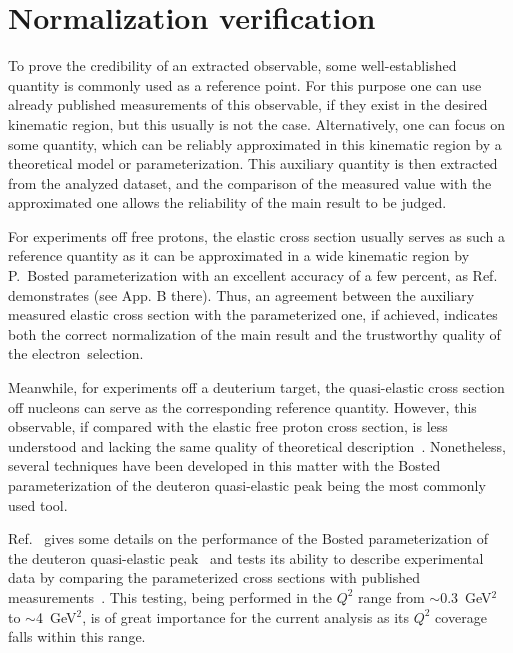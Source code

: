 \chapter{Normalization verification}
\label{Sect:norm}

To prove the credibility of an extracted observable, some well-established quantity is commonly used as a reference point. For this purpose one can use already published measurements of this observable, if they exist in the desired kinematic region, but this usually is not the case. Alternatively, one can focus on some quantity, which can be reliably approximated in this kinematic region by a theoretical model or parameterization. 
This auxiliary quantity is then extracted from the analyzed dataset, and the comparison of the measured value with the approximated one allows the reliability of the main result to be judged.

For experiments off free protons, the elastic cross section usually serves as such a reference quantity as it can be approximated in a wide kinematic region by P.~Bosted parameterization with an excellent accuracy of a few percent, as Ref.~\cite{note_QE_peak} demonstrates (see App. B there). Thus, an agreement between the auxiliary measured elastic cross section with the parameterized one, if achieved, indicates both the correct normalization of the main result and the trustworthy quality of the electron~selection.


Meanwhile, for experiments off a deuterium target, the quasi-elastic cross section off nucleons can serve as the corresponding reference quantity. However, this observable, if compared with the elastic free proton cross section, is less understood and lacking the same quality of theoretical description~\cite{note_QE_peak}. Nonetheless, several techniques have been developed in this matter with the Bosted parameterization of the deuteron quasi-elastic peak being the most commonly used tool.



Ref.~\cite{note_QE_peak} gives some details on the performance of the Bosted parameterization of the deuteron quasi-elastic peak~\cite{Bosted_fit,Bosted:2007xd} and tests its ability to describe experimental data by comparing the parameterized cross sections with published measurements~\cite{Hanson:1973vf,Rock:1991jy,Rock_SLAC}. This testing, being performed in the $Q^{2}$ range from $\sim$0.3~GeV$^2$ to $\sim$4~GeV$^2$, is of great importance for the current analysis as its $Q^{2}$ coverage falls within this range.


